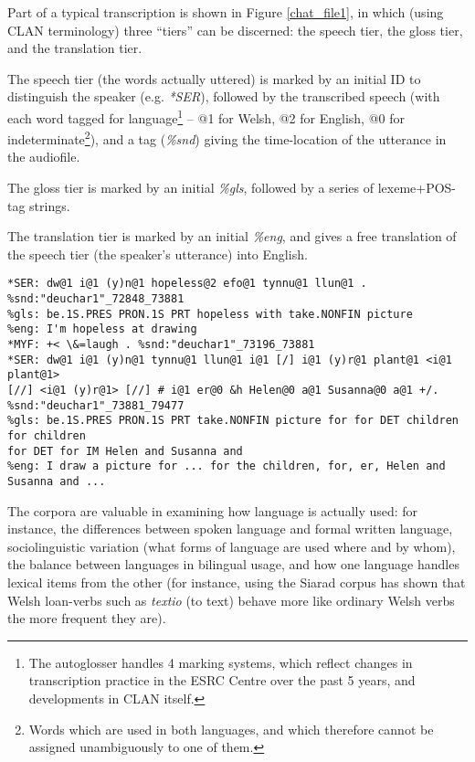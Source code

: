 \documentclass[11pt]{article}
\begin{document}
Part of a typical transcription is shown in Figure \ref{chat_file1}, in which (using CLAN terminology) three ``tiers'' can be discerned: the speech tier, the gloss tier, and the translation tier.

The speech tier (the words actually uttered) is marked by an initial ID to distinguish the speaker (e.g. \textit{*SER}), followed by the transcribed speech (with each word tagged for language\footnote{The autoglosser handles 4 marking systems, which reflect changes in transcription practice in the ESRC Centre over the past 5 years, and developments in CLAN itself.} -- @1 for Welsh, @2 for English, @0 for indeterminate\footnote{Words which are used in both languages, and which therefore cannot be assigned unambiguously to one of them.}), and a tag (\textit{\%snd}) giving the time-location of the utterance in the audiofile.

The gloss tier is marked by an initial \textit{\%gls}, followed by a series of lexeme+POS-tag strings.

The translation tier is marked by an initial \textit{\%eng}, and gives a free translation of the speech tier (the speaker's utterance) into English.

\begin{figure*} 
\begin{footnotesize}
\begin{verbatim}
*SER: dw@1 i@1 (y)n@1 hopeless@2 efo@1 tynnu@1 llun@1 . %snd:"deuchar1"_72848_73881
%gls: be.1S.PRES PRON.1S PRT hopeless with take.NONFIN picture
%eng: I'm hopeless at drawing
*MYF: +< \&=laugh . %snd:"deuchar1"_73196_73881
*SER: dw@1 i@1 (y)n@1 tynnu@1 llun@1 i@1 [/] i@1 (y)r@1 plant@1 <i@1 plant@1> 
[//] <i@1 (y)r@1> [//] # i@1 er@0 &h Helen@0 a@1 Susanna@0 a@1 +/. 
%snd:"deuchar1"_73881_79477
%gls: be.1S.PRES PRON.1S PRT take.NONFIN picture for for DET children for children 
for DET for IM Helen and Susanna and
%eng: I draw a picture for ... for the children, for, er, Helen and Susanna and ...
\end{verbatim}
\end{footnotesize}
\caption{Excerpt from the file \textit{deuchar1} in the Siarad corpus (Welsh-English)}
\label{chat_file1}
\end{figure*}

The corpora are valuable in examining how language is actually used: for instance, the differences between spoken language and formal written language, sociolinguistic variation (what forms of language are used where and by whom), the balance between languages in bilingual usage, and how one language handles lexical items from the other (for instance, using the Siarad corpus \cite{stammers2010} has shown that Welsh loan-verbs such as \textit{textio} (to text) behave more like ordinary Welsh verbs the more frequent they are).
\end{document}

